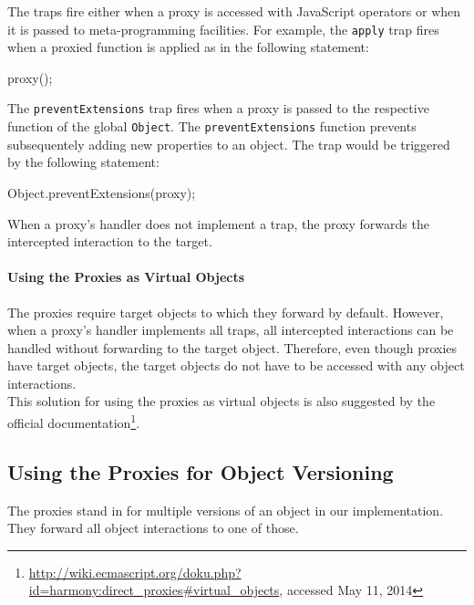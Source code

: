 The traps fire either when a proxy is accessed with JavaScript operators or when it is passed to meta-programming facilities.
For example, the \lstinline{apply} trap fires when a proxied function is applied as in the following statement:

\begin{code}{}{}
proxy();
\end{code}
\iffalse
\end{verbatim}\fi
The \lstinline{preventExtensions} trap fires when a proxy is passed to the respective function of the global \lstinline{Object}.
The \lstinline{preventExtensions} function prevents subsequentely adding new properties to an object.
The trap would be triggered by the following statement:

\begin{code}{}{}
Object.preventExtensions(proxy);
\end{code}
\iffalse
\end{verbatim}\fi

When a proxy's handler does not implement a trap, the proxy forwards the intercepted interaction to the target.

\paragraph{Using the Proxies as Virtual Objects}
The proxies require target objects to which they forward by default.
However, when a proxy's handler implements all traps, all intercepted interactions can be handled without forwarding to the target object.
Therefore, even though proxies have target objects, the target objects do not have to be accessed with any object interactions.
\\
This solution for using the proxies as virtual objects is also suggested by the official documentation\footnote{\url{http://wiki.ecmascript.org/doku.php?id=harmony:direct\_proxies\#virtual_objects}, accessed May 11, 2014}.



\subsection{Using the Proxies for Object Versioning} \label{subsec:IMPLEMENTATION:1.2}

The proxies stand in for multiple versions of an object in our implementation.
They forward all object interactions to one of those.

